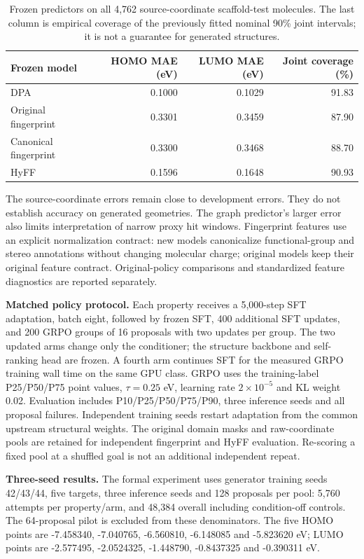 \documentclass[11pt,a4paper]{article}
\begin{document}
\begin{table}[!htbp]
\centering
\caption{Frozen predictors on all 4,762 source-coordinate scaffold-test
molecules. The last column is empirical coverage of the previously
fitted nominal 90\% joint intervals; it is not a guarantee for generated
structures. }
\begin{tabular}{@{}lrrr@{}}

\toprule\noalign{}
Frozen model & HOMO MAE (eV) & LUMO MAE (eV) & Joint coverage (\%) \\
\midrule\noalign{}

DPA & 0.1000 & 0.1029 & 91.83 \\
Original fingerprint & 0.3301 & 0.3459 & 87.90 \\
Canonical fingerprint & 0.3300 & 0.3468 & 88.70 \\
HyFF & 0.1596 & 0.1648 & 90.93 \\
\bottomrule
\end{tabular}
\end{table}

The source-coordinate errors remain close to development errors. They do
not establish accuracy on generated geometries. The graph predictor's
larger error also limits interpretation of narrow proxy hit windows.
Fingerprint features use an explicit normalization contract: new models
canonicalize functional-group and stereo annotations without changing
molecular charge; original models keep their original feature contract.
Original-policy comparisons and standardized feature diagnostics are
reported separately.

\textbf{Matched policy protocol.} Each property receives a 5,000-step
SFT adaptation, batch eight, followed by frozen SFT, 400 additional SFT
updates, and 200 GRPO groups of 16 proposals with two updates per group.
The two updated arms change only the conditioner; the structure backbone
and self-ranking head are frozen. A fourth arm continues SFT for the
measured GRPO training wall time on the same GPU class. GRPO uses the
training-label P25/P50/P75 point values, \(\tau=0.25\) eV, learning rate
\(2\times10^{-5}\) and KL weight 0.02. Evaluation includes
P10/P25/P50/P75/P90, three inference seeds and all proposal failures.
Independent training seeds restart adaptation from the common upstream
structural weights. The original domain masks and raw-coordinate pools
are retained for independent fingerprint and HyFF evaluation. Re-scoring
a fixed pool at a shuffled goal is not an additional independent repeat.

\textbf{Three-seed results.} The formal experiment uses generator
training seeds 42/43/44, five targets, three inference seeds and 128
proposals per pool: 5,760 attempts per property/arm, and 48,384 overall
including condition-off controls. The 64-proposal pilot is excluded from
these denominators. The five HOMO points are -7.458340, -7.040765,
-6.560810, -6.148085 and -5.823620 eV; LUMO points are -2.577495,
-2.0524325, -1.448790, -0.8437325 and -0.390311 eV.
\end{document}
